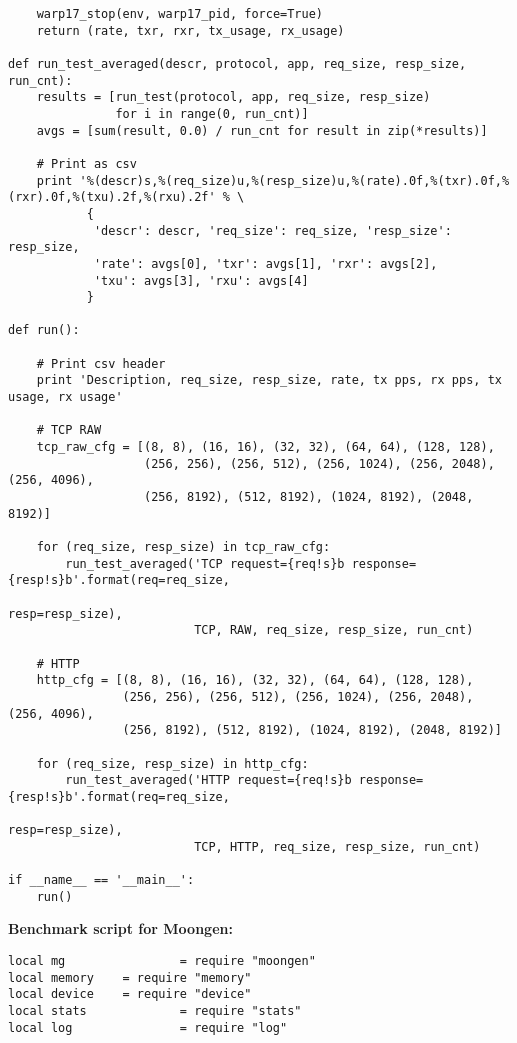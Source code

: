 \begin{landscape}
\begin{verbatim}
    warp17_stop(env, warp17_pid, force=True)
    return (rate, txr, rxr, tx_usage, rx_usage)

def run_test_averaged(descr, protocol, app, req_size, resp_size, run_cnt):
    results = [run_test(protocol, app, req_size, resp_size)
               for i in range(0, run_cnt)]
    avgs = [sum(result, 0.0) / run_cnt for result in zip(*results)]

    # Print as csv
    print '%(descr)s,%(req_size)u,%(resp_size)u,%(rate).0f,%(txr).0f,%(rxr).0f,%(txu).2f,%(rxu).2f' % \
           {
            'descr': descr, 'req_size': req_size, 'resp_size': resp_size,
            'rate': avgs[0], 'txr': avgs[1], 'rxr': avgs[2],
            'txu': avgs[3], 'rxu': avgs[4]
           }

def run():

    # Print csv header
    print 'Description, req_size, resp_size, rate, tx pps, rx pps, tx usage, rx usage'

    # TCP RAW
    tcp_raw_cfg = [(8, 8), (16, 16), (32, 32), (64, 64), (128, 128),
                   (256, 256), (256, 512), (256, 1024), (256, 2048), (256, 4096),
                   (256, 8192), (512, 8192), (1024, 8192), (2048, 8192)]

    for (req_size, resp_size) in tcp_raw_cfg:
        run_test_averaged('TCP request={req!s}b response={resp!s}b'.format(req=req_size,
                                                                           resp=resp_size),
                          TCP, RAW, req_size, resp_size, run_cnt)

    # HTTP
    http_cfg = [(8, 8), (16, 16), (32, 32), (64, 64), (128, 128),
                (256, 256), (256, 512), (256, 1024), (256, 2048), (256, 4096),
                (256, 8192), (512, 8192), (1024, 8192), (2048, 8192)]

    for (req_size, resp_size) in http_cfg:
        run_test_averaged('HTTP request={req!s}b response={resp!s}b'.format(req=req_size,
                                                                            resp=resp_size),
                          TCP, HTTP, req_size, resp_size, run_cnt)

if __name__ == '__main__':
    run()
\end{verbatim}

\textbf{Benchmark script for Moongen:}
\begin{verbatim}
local mg                = require "moongen"
local memory    = require "memory"
local device    = require "device"
local stats             = require "stats"
local log               = require "log"


\end{verbatim}
\end{landscape}
